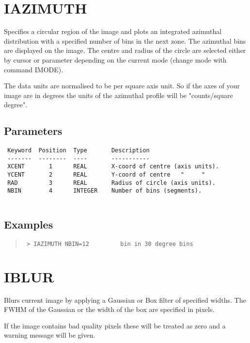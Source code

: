 \documentclass{book}
\renewcommand{\_}{{\tt\char'137}}     %
\begin{document}
\section{IAZIMUTH}
Specifies a circular region of the image and plots an integrated
azimuthal distribution with a specified number of bins in the next
zone. The azimuthal bins are displayed on the image. The centre
and radius of the circle are selected either by cursor or parameter
depending on the current mode (change mode with command IMODE).
 
The data units are normalised to be per square axis unit. So if
the axes of your image are in degrees the units of the azimuthal
profile will be "counts/square degree".
 
\subsection{Parameters}
\begin{verbatim}
 Keyword  Position  Type       Description
 -------  --------  ----       -----------
 XCENT       1      REAL       X-coord of centre (axis units).
 YCENT       2      REAL       Y-coord of centre   "     "
 RAD         3      REAL       Radius of circle (axis units).
 NBIN        4      INTEGER    Number of bins (segments).
 
\end{verbatim}\subsection{Examples}
\begin{quote}\begin{verbatim}
 > IAZIMUTH NBIN=12         bin in 30 degree bins
\end{verbatim}\end{quote}
\section{IBLUR}
Blurs current image by applying a Gaussian or Box filter of specified
widths. The FWHM of the Gaussian or the width of the box are specified
in pixels.
 
If the image contains bad quality pixels these will be treated as
zero and a warning message will be given.
 
\end{document}
